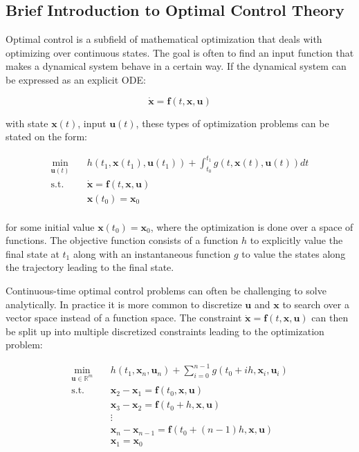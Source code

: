 \subsection{Brief Introduction to Optimal Control Theory}

Optimal control is a subfield of mathematical optimization that deals with optimizing over continuous states. The goal is often to find an input function that makes a dynamical system behave in a certain way. If the dynamical system can be expressed as an explicit ODE:

\begin{equation}
    \dot{\bm{x}} = \bm{f}(t, \bm{x}, \bm{u})
    \label{eq:optimalcontrolode}
\end{equation}

\noindent with state $\bm{x}(t)$, input $\bm{u}(t)$, these types of optimization problems can be stated on the form:

\begin{equation}
    \begin{aligned}
        \min_{\bm{u}(t)} \quad & h(t_1, \bm{x}(t_1), \bm{u}(t_1)) + \int_{t_0}^{t_1} g(t, \bm{x}(t), \bm{u}(t)) dt \\
        \textrm{s.t.} \quad & \dot{\bm{x}} = \bm{f}(t, \bm{x}, \bm{u}) \\
        & \bm{x}(t_0) = \bm{x}_0 \\
    \end{aligned}
    \label{eq:continuousoptimalcontrol}
\end{equation}

\noindent for some initial value $\bm{x}(t_0) = \bm{x}_0$, where the optimization is done over a space of functions. The objective function consists of a function $h$ to explicitly value the final state at $t_1$ along with an instantaneous function $g$ to value the states along the trajectory leading to the final state.

Continuous-time optimal control problems can often be challenging to solve analytically. In practice it is more common to discretize $\bm{u}$ and $\bm{x}$ to search over a vector space instead of a function space. The constraint $\dot{\bm{x}} = \bm{f}(t, \bm{x}, \bm{u})$ can then be split up into multiple discretized constraints leading to the optimization problem:

\begin{equation}
    \begin{aligned}
        \min_{\bm{u} \in \mathbb{R}^{m}} \quad & h(t_1, \bm{x}_n, \bm{u}_n) + \sum_{i=0}^{n-1} g(t_0 + i h, \bm{x}_i, \bm{u}_i) \\
        \textrm{s.t.} \quad & \bm{x}_2 - \bm{x}_1 = \bm{f}(t_0, \bm{x}, \bm{u}) \\
        & \bm{x}_3 - \bm{x}_2 = \bm{f}(t_0 + h, \bm{x}, \bm{u}) \\
        & \vdots \\
        & \bm{x}_n - \bm{x}_{n-1} = \bm{f}(t_0 + (n - 1) h, \bm{x}, \bm{u}) \\
        & \bm{x}_1 = \bm{x}_0
    \end{aligned}
\end{equation}

